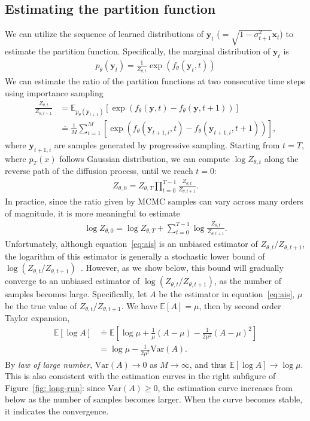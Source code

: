 \documentclass{article} \usepackage{iclr2021_conference,times}
\def\Figref#1{Figure~\ref{#1}}
\def\eqref#1{equation~\ref{#1}}
\def\rvx{{\mathbf{x}}}
\def\rvy{{\mathbf{y}}}
\newcommand{\E}{\mathbb{E}}
\newcommand{\Var}{\mathrm{Var}}
\begin{document}
\subsection{Estimating the partition function} \label{app:ais}
We can utilize the sequence of learned distributions of $\rvy_t$ ($ = \sqrt{1 - \sigma_{t+1}^2} \rvx_t$) to estimate the partition function. Specifically, the marginal distribution of $\rvy_t$ is
\begin{align}
  p_\theta(\rvy_t) =  \frac{1}{Z_{\theta, t}} \exp\left(f_\theta(\rvy_t, t)\right)
\end{align}
We can estimate the ratio of the partition functions at two consecutive time steps using importance sampling
\begin{align}
\frac{Z_{\theta, t}}{Z_{\theta, t+1}} &= \E_{p_{\theta}(\rvy_{t+1})}\left[\exp(f_\theta(\rvy, t) - f_\theta(\rvy, t+1))\right] \\
 & \doteq \frac{1}{M} \sum_{i=1}^M\left[\exp(f_\theta(\rvy_{t+1, i}, t) - f_\theta(\rvy_{t+1, i}, t+1)) \right], \label{eq:ais}
\end{align}
where $\rvy_{t+1, i}$ are samples generated by progressive sampling.
Starting from $t= T$, where $p_T(x)$ follows Gaussian distribution, we can compute $\log Z_{\theta, t}$ along the reverse path of the diffusion process, until we reach $t=0$:
\begin{align}
     Z_{\theta, 0} = Z_{\theta, T} \prod_{t=0}^{T-1} \frac{Z_{\theta, t}}{Z_{\theta, t+1}}.
\end{align}
In practice, since the ratio given by MCMC samples can vary across many orders of magnitude, it is more meaningful to estimate \begin{eqnarray}
\log Z_{\theta, 0} = \log Z_{\theta, T} + \sum_{t=0}^{T-1} \log \frac{Z_{\theta, t}}{Z_{\theta, t+1}}. 
\end{eqnarray}
Unfortunately, although \eqref{eq:ais} is an unbiased estimator of $Z_{\theta, t} / Z_{\theta, t+1}$, the logarithm of this estimator is generally a stochastic lower bound of $\log(Z_{\theta, t} / Z_{\theta, t+1})$~\citep{grosse2016measuring}. However, as we show below, this bound will gradually converge to an unbiased estimator of $\log(Z_{\theta, t} / Z_{\theta, t+1})$, as the number of samples becomes large. Specifically, let $A$ be the estimator in \eqref{eq:ais}, $\mu$ be the true value of $Z_{\theta, t} / Z_{\theta, t+1}$. We have $\E[A] = \mu$, then by second order Taylor expansion,
\begin{align}
\E[\log A] &\doteq \E\left[\log \mu + \frac{1}{\mu} (A - \mu) - \frac{1}{2\mu^2}(A - \mu)^2\right]\\
&= \log \mu - \frac{1}{2\mu^2} \Var(A). 
\end{align}
By {\em law of large number}, $\Var(A) \to 0$ as $M \to \infty$, and thus $\E[\log A] \to \log \mu$. This is also consistent with the estimation curves in the right subfigure of \Figref{fig: long-run}: since $\Var(A) \geq 0$, the estimation curve increases from below as the number of samples becomes larger. When the curve becomes stable, it indicates the convergence. 
\end{document}
